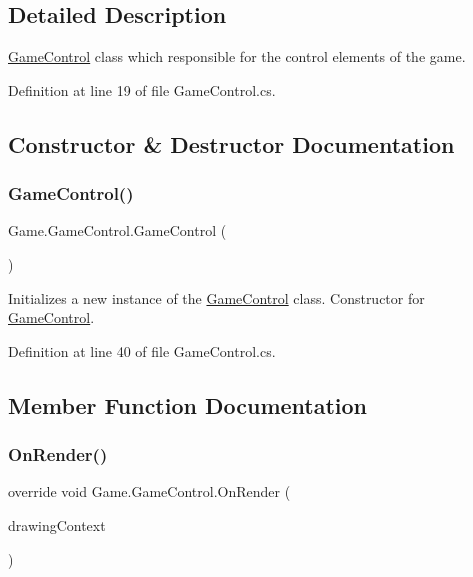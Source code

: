 \subsection{Detailed Description}
\mbox{\hyperlink{class_game_1_1_game_control}{Game\+Control}} class which responsible for the control elements of the game. 



Definition at line 19 of file Game\+Control.\+cs.



\subsection{Constructor \& Destructor Documentation}
\mbox{\label{class_game_1_1_game_control_a61be983ae9907130c5b76ef9a7cc95f7}} 
\subsubsection{\texorpdfstring{GameControl()}{GameControl()}}
{\footnotesize\ttfamily Game.\+Game\+Control.\+Game\+Control (\begin{DoxyParamCaption}{ }\end{DoxyParamCaption})}



Initializes a new instance of the \mbox{\hyperlink{class_game_1_1_game_control}{Game\+Control}} class. Constructor for \mbox{\hyperlink{class_game_1_1_game_control}{Game\+Control}}. 



Definition at line 40 of file Game\+Control.\+cs.



\subsection{Member Function Documentation}
\mbox{\label{class_game_1_1_game_control_a16e0be24a3d4e6e8ce15950e66f51309}} 
\subsubsection{\texorpdfstring{OnRender()}{OnRender()}}
{\footnotesize\ttfamily override void Game.\+Game\+Control.\+On\+Render (\begin{DoxyParamCaption}\item[{Drawing\+Context}]{drawing\+Context }\end{DoxyParamCaption})\hspace{0.3cm}{\ttfamily [protected]}}



